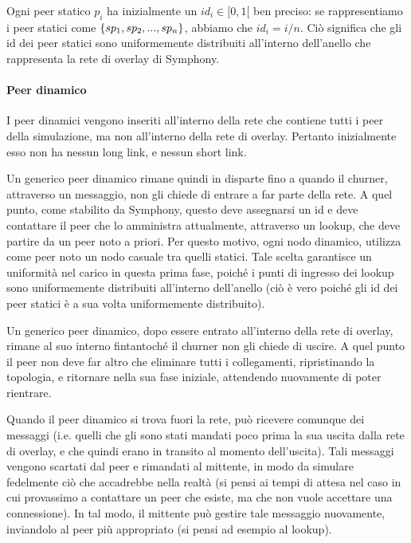 \documentclass[prodmode,acmtap]{acmlarge}
\begin{document}
Ogni peer statico $p_i$ ha inizialmente un $id_i \in [0,1[$ ben preciso: se rappresentiamo i peer statici come $\{sp_1, \linebreak[1] sp_2, \linebreak[1] ..., \linebreak[1] sp_n\}$, abbiamo che $id_i = i / n$. Ciò significa che gli id dei peer statici sono uniformemente distribuiti all'interno dell'anello che rappresenta la rete di overlay di Symphony.

\paragraph{Peer dinamico}
I peer dinamici vengono inseriti all'interno della rete che contiene tutti i peer della simulazione, ma non all'interno della rete di overlay. Pertanto inizialmente esso non ha nessun long link, e nessun short link. 

Un generico peer dinamico rimane quindi in disparte fino a quando il churner, attraverso un messaggio, non gli chiede di entrare a far parte della rete. A quel punto, come stabilito da Symphony, questo deve assegnarsi un id e deve contattare il peer che lo amministra attualmente, attraverso un lookup, che deve partire da un peer noto  a priori. Per questo motivo, ogni nodo dinamico, utilizza come peer noto un nodo casuale tra quelli statici. Tale scelta garantisce un uniformità nel carico in questa prima fase, poiché i punti di ingresso dei lookup sono uniformemente distribuiti all'interno dell'anello (ciò è vero poiché gli id dei peer statici è a sua volta uniformemente distribuito).

Un generico peer dinamico, dopo essere entrato all'interno della rete di overlay, rimane al suo interno fintantoché il churner non gli chiede di uscire. A quel punto il peer non deve far altro che eliminare tutti i collegamenti, ripristinando la topologia, e ritornare nella sua fase iniziale, attendendo nuovamente di poter rientrare. 

Quando il peer dinamico si trova fuori la rete, può ricevere comunque dei messaggi (i.e. quelli che gli sono stati mandati poco prima la sua uscita dalla rete di overlay, e che quindi erano in transito al momento dell'uscita). Tali messaggi vengono scartati dal peer e rimandati al mittente, in modo da simulare fedelmente ciò che accadrebbe nella realtà (si pensi ai tempi di attesa nel caso in cui provassimo a contattare un peer che esiste, ma che non vuole accettare una connessione). In tal modo, il mittente può gestire tale messaggio nuovamente, inviandolo al peer più appropriato (si pensi ad esempio al lookup).
\end{document}
